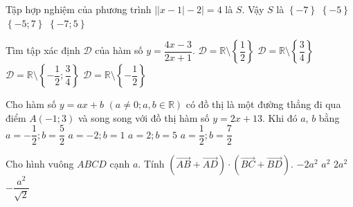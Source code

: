 \begin{ex}%
	Tập hợp nghiệm của phương trình $\left| \left| x-1\right|-2\right|=4 $ là $S$. Vậy $S$ là
	\choice
	{$\left\lbrace {-7} \right\rbrace $}
	{$\left\lbrace {-5} \right\rbrace $}
	{\True $\left\lbrace {-5; 7} \right\rbrace $}
	{$\left\lbrace {-7; 5} \right\rbrace $}
\end{ex}

\begin{ex}%
	Tìm tập xác định $\mathscr{D}$ của  hàm số $y=\dfrac{4x-3}{2x+1}$.
	\choice
	{$\mathscr{D}=\mathbb{R}\setminus\left\lbrace {\dfrac{1}{2}} \right\rbrace $}
	{$\mathscr{D}=\mathbb{R}\setminus\left\lbrace {\dfrac{3}{4}} \right\rbrace $}
	{$\mathscr{D}=\mathbb{R}\setminus\left\lbrace {-\dfrac{1}{2};\dfrac{3}{4}} \right\rbrace $}
	{\True $\mathscr{D}=\mathbb{R}\setminus\left\lbrace {-\dfrac{1}{2}} \right\rbrace $}
\end{ex}

\begin{ex}%
	Cho hàm số $y=ax+b$ $\left( a\neq 0; a,b\in\mathbb{R} \right)$ có đồ thị là một đường thẳng đi qua điểm $A(-1;3)$ và song song với đồ thị hàm số $y=2x+13$. Khi đó $a$, $b$ bằng 
	\choice
	{$a=-\dfrac{1}{2}; b=\dfrac{5}{2}$}
	{$a=-2; b=1$}
	{\True $a=2; b=5$}
	{$a=\dfrac{1}{2}; b=\dfrac{7}{2}$}
\end{ex}

\begin{ex}%
	Cho hình vuông $ABCD$ cạnh $a$. Tính $\left( \vec{AB}+\vec{AD}\right)\cdot\left( \vec{BC}+\vec{BD}\right)$.
	\choice
	{$-2a^2$}
	{\True $a^2$}
	{$2a^2$}
	{$-\dfrac{a^2}{\sqrt{2}}$}
\end{ex}

